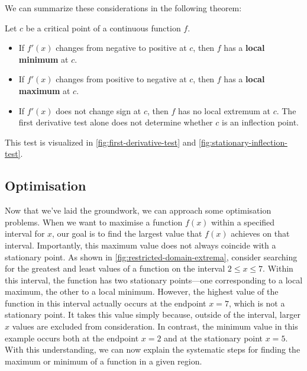 We can summarize these considerations in the following theorem:

\begin{theorem}
    Let \(c\) be a critical point of a continuous function \(f\).
    \begin{itemize}
        \item If \(f'(x)\) changes from negative to positive at \(c\), then \(f\) has a \textbf{local minimum} at \(c\).
        \item If \(f'(x)\) changes from positive to negative at \(c\), then \(f\) has a \textbf{local maximum} at \(c\).
        \item If \(f'(x)\) does not change sign at \(c\), then \(f\) has no local extremum at \(c\). The first derivative test alone does not determine whether $c$ is an inflection point.
    \end{itemize}

    \end{theorem}
This test is visualized in \autoref{fig:first-derivative-test} and \autoref{fig:stationary-inflection-test}.


\subsection*{Optimisation}
Now that we've laid the groundwork, we can approach some optimisation problems. When we want to maximise a function $f(x)$ within a specified interval for $x$, our goal is to find the largest value that $f(x)$ achieves on that interval. Importantly, this maximum value does not always coincide with a stationary point. As shown in \autoref{fig:restricted-domain-extrema}, consider searching for the greatest and least values of a function on the interval $2 \leq x \leq 7$. Within this interval, the function has two stationary points—one corresponding to a local maximum, the other to a local minimum. However, the highest value of the function in this interval actually occurs at the endpoint $x=7$, which is not a stationary point. It takes this value simply because, outside of the interval, larger $x$ values are excluded from consideration. In contrast, the minimum value in this example occurs both at the endpoint $x=2$ and at the stationary point $x=5$. With this understanding, we can now explain the systematic steps for finding the maximum or minimum of a function in a given region.


